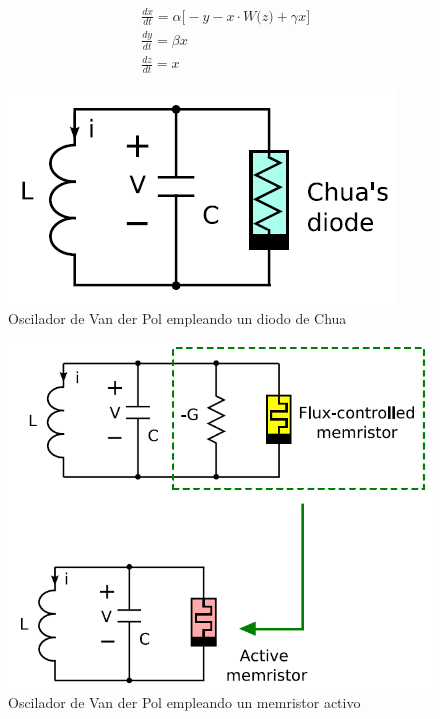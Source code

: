 \documentclass[11pt,letterpaper]{article}
\begin{document}
\begin{multicols*}{2}
\begin{align}
\label{Eq:MemVanderPol}
&\frac{dx}{dt} = \alpha\bigg[- y - x\cdot W\big(z\big) + \gamma x\bigg] \nonumber \\ 
&\frac{dy}{dt} = \beta x \\
&\frac{dz}{dt} = x \nonumber 
\end{align}

\begin{figure}[H]
    \centering
    \includegraphics[scale=0.3]{DiodeVanderPol.png}
    \caption{Oscilador de Van der Pol empleando un diodo de Chua \cite{Itoh2008}}
    \label{Fig:DiodeVanderPol}
\end{figure}

\begin{figure}[H]
    \centering
    \includegraphics[scale=0.25]{MemVanderPol.png}
    \caption{Oscilador de Van der Pol empleando un memristor activo \cite{Itoh2008}}
    \label{Fig:MemVanderPol}
\end{figure}


\end{multicols*}
\end{document}

